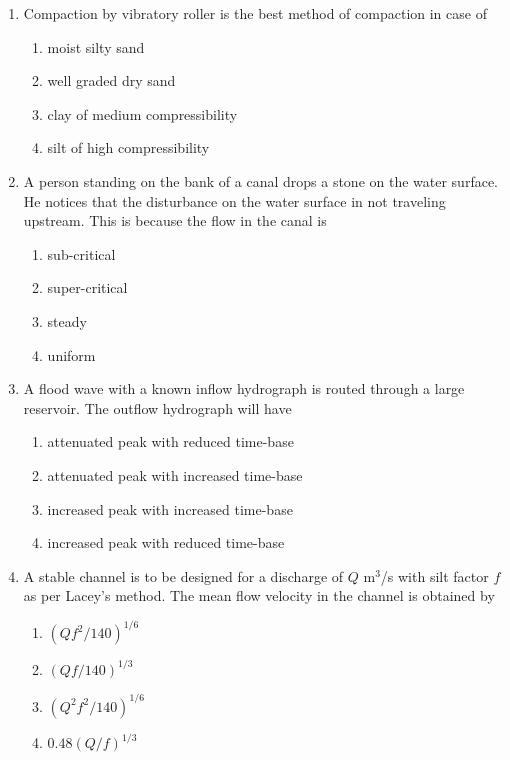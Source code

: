 \documentclass[journal]{IEEEtran}
\begin{document}
\begin{enumerate}
\item 
Compaction by vibratory roller is the best method of compaction in case of  \textbf{}
\begin{multicols}{2}
\begin{enumerate}
\item moist silty sand
\item well graded dry sand
\item clay of medium compressibility
\item silt of high compressibility
\end{enumerate}
\end{multicols}

\item A person standing on the bank of a canal drops a stone on the water surface. He notices that the disturbance on the water surface in not traveling upstream. This is because the flow in the canal is \textbf{}
\begin{multicols}{2}
\begin{enumerate}
\item sub-critical
\item super-critical 
\item steady 
\item uniform
\end{enumerate}
\end{multicols}


\item A flood wave with a known inflow hydrograph is routed through a large reservoir. The outflow hydrograph will have \textbf{}

\begin{enumerate}
\item attenuated peak with reduced time-base 
\item attenuated peak with increased time-base 
\item increased peak with increased time-base 
\item increased peak with reduced time-base

\end{enumerate}


\item A stable channel is to be designed for a discharge of $Q$ m$^{3}$/s with silt factor $f$ as per Lacey's method. The mean flow velocity  in the channel is obtained by \textbf{}
\begin{multicols}{2}
\begin{enumerate}
\item $(Qf^{2}/140)^{1/6}$ 
\item $(Qf/140)^{1/3}$ 
\item $(Q^{2}f^{2}/140)^{1/6}$ 
\item $0.48(Q/f)^{1/3}$
\end{enumerate}
\end{multicols}


\end{enumerate}
\end{document}
